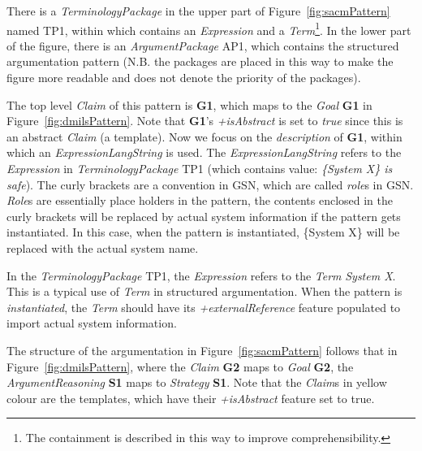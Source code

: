 There is a \textit{TerminologyPackage} in the upper part of Figure~\ref{fig:sacmPattern} named TP1, within which contains an \textit{Expression} and a \textit{Term}\footnote{The containment is described in this way to improve comprehensibility.}. In the lower part of the figure, there is an \textit{ArgumentPackage} AP1, which contains the structured argumentation pattern (N.B. the packages are placed in this way to make the figure more readable and does not denote the priority of the packages).

The top level \textit{Claim} of this pattern is \textbf{G1}, which maps to the \textit{Goal} \textbf{G1} in Figure~\ref{fig:dmilsPattern}. Note that \textbf{G1}'s \textit{+isAbstract} is set to \textit{true} since this is an abstract \textit{Claim} (a template). Now we focus on the \textit{description} of \textbf{G1}, within which an \textit{ExpressionLangString} is used. The \textit{ExpressionLangString} refers to the \textit{Expression} in \textit{TerminologyPackage} TP1 (which contains value: \textit{\{System X\} is safe}). The curly brackets are a convention in GSN, which are called \textit{role}s in GSN. \textit{Role}s are essentially place holders in the pattern, the contents enclosed in the curly brackets will be replaced by actual system information if the pattern gets instantiated. In this case, when the pattern is instantiated, \{System X\} will be replaced with the actual system name. 

In the \textit{TerminologyPackage} TP1, the \textit{Expression} refers to the \textit{Term} \textit{System X}. This is a typical use of \textit{Term} in structured argumentation. When the pattern is \textit{instantiated}, the \textit{Term} should have its \textit{+externalReference} feature populated to import actual system information. 

The structure of the argumentation in Figure~\ref{fig:sacmPattern} follows that in Figure~\ref{fig:dmilsPattern}, where the \textit{Claim} \textbf{G2} maps to \textit{Goal} \textbf{G2}, the \textit{ArgumentReasoning} \textbf{S1} maps to \textit{Strategy} \textbf{S1}. Note that the \textit{Claim}s in yellow colour are the templates, which have their \textit{+isAbstract} feature set to true. 

